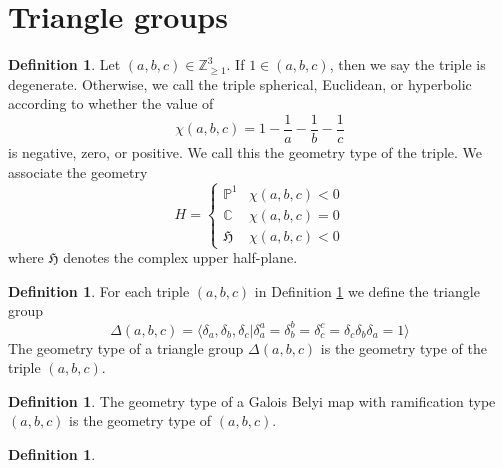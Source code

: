 \documentclass{dcthesis}
\newcommand{\PP}{\mathbb P}
\newcommand{\CC}{\mathbb C}
\newcommand{\ZZ}{\mathbb Z}
\newcommand{\defi}[1]{\textsf{#1}}
\theoremstyle{definition}
\newtheorem{definition}[prop]{Definition}
\theoremstyle{remark}
\numberwithin{equation}{section}
\numberwithin{figure}{section}
\begin{document}
{  \section{Triangle groups}{\label{sec:trianglegroups}
    \begin{definition}
      \label{def:geometrytype}
      Let $(a,b,c)\in\ZZ_{\geq 1}^3$.
      If $1\in(a,b,c)$, then we say the triple is \defi{degenerate}.
      Otherwise, we call the triple
      \defi{spherical},
      \defi{Euclidean},
      or \defi{hyperbolic}
      according to whether the value of
      \begin{equation}
        \label{eqn:eulerchar}
        \chi(a,b,c) = 1-\frac{1}{a}-\frac{1}{b}-\frac{1}{c}
      \end{equation}
      is negative, zero, or positive.
      We call this the \defi{geometry type}
      of the triple.
      We associate the \defi{geometry}
      \begin{equation}
        \label{eqn:geometrytype}
        H=
        \begin{cases}
          \PP^1&\chi(a,b,c)<0\\
          \CC&\chi(a,b,c)=0\\
          \mathfrak{H}&\chi(a,b,c)<0
        \end{cases}
      \end{equation}
      where $\mathfrak{H}$ denotes the complex upper half-plane.
    \end{definition}
    \begin{definition}
      \label{def:trianglegroup}
      For each triple $(a,b,c)$ in Definition \ref{def:geometrytype}
      we define the \defi{triangle group}
      \begin{equation}
        \label{eqn:trianglegroup}
        \Delta(a,b,c)
        =
        \langle
        \delta_a, \delta_b, \delta_c |
        \delta_a^a=\delta_b^b=\delta_c^c=\delta_c\delta_b\delta_a=1
        \rangle
      \end{equation}
      The \defi{geometry type}
      of a triangle group $\Delta(a,b,c)$
      is the geometry type of the triple $(a,b,c)$.
    \end{definition}
    \begin{definition}\label{def:geometrytypeofbelyimap}
      The \defi{geometry type} of a Galois Belyi map
      with ramification type $(a,b,c)$
      is the geometry type of $(a,b,c)$.
    \end{definition}
    \begin{definition}\label{def:geometrytypeofpermutationtriple}

\end{definition}}}
\end{document}

